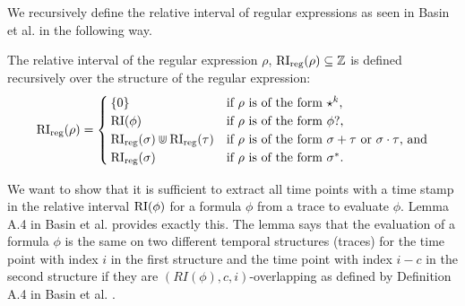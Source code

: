 We recursively define the relative interval of regular expressions as seen in Basin et al. \cite{Basin2020} in the following way.

\begin{definition}
    \label{def:rel-int-reg}
    The relative interval of the regular expression $\rho$, $\operatorname{RI}_{\text{reg}}(\rho) \subseteq \mathbb{Z}$ is defined recursively over the structure of the regular expression:
    \begin{equation*}
        \operatorname{RI}_{\text{reg}}(\rho) =
        \begin{cases}
            \{0\} & \text{if $\rho$ is of the form $\star^k$,} \\
            \operatorname{RI}(\phi) & \text{if $\rho$ is of the form $\phi?$,} \\
            \operatorname{RI}_{\text{reg}}(\sigma) \Cup \operatorname{RI}_{\text{reg}}(\tau) & \text{if $\rho$ is of the form $\sigma + \tau$ or $\sigma \cdot \tau$, and} \\
            \operatorname{RI}_{\text{reg}}(\sigma) & \text{if $\rho$ is of the form $\sigma^*$.}

        \end{cases}
    \end{equation*}
\end{definition}


We want to show that it is sufficient to extract all time points with a time stamp in the relative interval $\operatorname{RI}(\phi)$ for a formula $\phi$ from a trace to evaluate $\phi$.
Lemma A.4 in Basin et al. \cite{Basin2016} provides exactly this.
The lemma says that the evaluation of a formula $\phi$ is the same on two different temporal structures (traces) for the time point with index $i$ in the first structure and the time point with index $i-c$ in the second structure if they are $(RI(\phi),c,i)$-overlapping as defined by Definition A.4 in Basin et al. \cite{Basin2016}.

